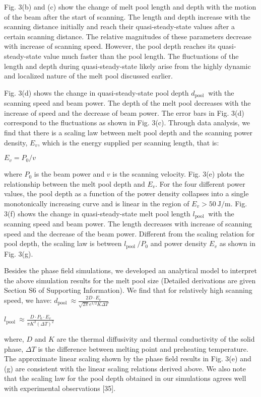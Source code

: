 \documentclass[10pt]{article}
\begin{document}
Fig. 3(b) and (c) show the change of melt pool length and depth with the motion of the beam after the start of scanning. The length and depth increase with the scanning distance initially and reach their quasi-steady-state values after a certain scanning distance. The relative magnitudes of these parameters decrease with increase of scanning speed. However, the pool depth reaches its quasi-steady-state value much faster than the pool length. The fluctuations of the length and depth during quasi-steady-state likely arise from the highly dynamic and localized nature of the melt pool discussed earlier.

Fig. 3(d) shows the change in quasi-steady-state pool depth $d_{\text {pool }}$ with the scanning speed and beam power. The depth of the melt pool decreases with the increase of speed and the decrease of beam power. The error bars in Fig. 3(d) correspond to the fluctuations as shown in Fig. 3(c). Through data analysis, we find that there is a scaling law between melt pool depth and the scanning power density, $E_{v}$, which is the energy supplied per scanning length, that is:

$E_{v}=P_{0} / v$

where $P_{0}$ is the beam power and $v$ is the scanning velocity. Fig. 3(e) plots the relationship between the melt pool depth and $E_{v}$. For the four different power values, the pool depth as a function of the power density collapses into a single monotonically increasing curve and is linear in the region of $E_{v}>50 \mathrm{~J} / \mathrm{m}$. Fig. 3(f) shows the change in quasi-steady-state melt pool length $l_{\text {pool }}$ with the scanning speed and beam power. The length decreases with increase of scanning speed and the decrease of the beam power. Different from the scaling relation for pool depth, the scaling law is between $l_{\text {pool }} / P_{0}$ and power density $E_{v}$ as shown in Fig. 3(g).

Besides the phase field simulations, we developed an analytical model to interpret the above simulation results for the melt pool size (Detailed derivations are given Section S6 of Supporting Information). We find that for relatively high scanning speed, we have: $d_{\text {pool }} \approx \frac{2 D \cdot E_{v}}{\sqrt{2 \pi} e^{1 / 2} K \Delta T}$

$l_{\text {pool }} \approx \frac{D \cdot P_{0} \cdot E_{v}}{\pi K^{2}(\Delta T)^{2}}$

where, $D$ and $K$ are the thermal diffusivity and thermal conductivity of the solid phase, $\Delta T$ is the difference between melting point and preheating temperature. The approximate linear scaling shown by the phase field results in Fig. 3(e) and (g) are consistent with the linear scaling relations derived above. We also note that the scaling law for the pool depth obtained in our simulations agrees well with experimental observations [35].
\end{document}
